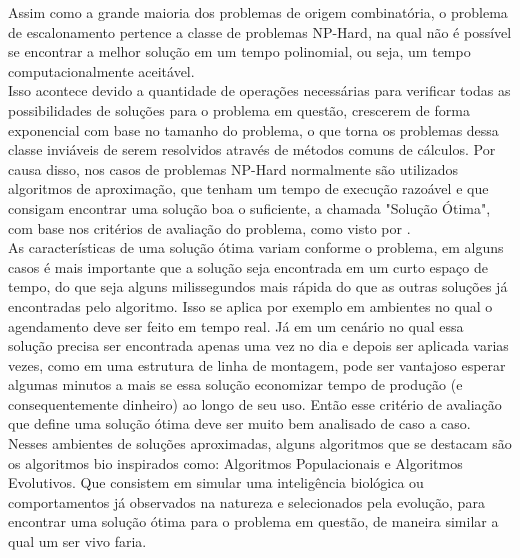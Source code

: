 Assim como a grande maioria dos problemas de origem combinatória, o problema de escalonamento pertence a classe de problemas NP-Hard, na qual não é possível se encontrar a melhor solução em um tempo polinomial, ou seja, um tempo computacionalmente aceitável.\\
\indent Isso acontece devido a quantidade de operações necessárias para verificar todas as possibilidades de soluções para o problema em questão, crescerem de forma exponencial com base no tamanho do problema,
o que torna os problemas dessa classe inviáveis de serem resolvidos através de métodos comuns de cálculos.
%
%
\indent Por causa disso, nos casos de problemas NP-Hard normalmente são utilizados algoritmos de aproximação, que tenham um tempo de execução razoável e que consigam encontrar uma solução boa o suficiente, a chamada "Solução Ótima",  com base nos critérios de avaliação do problema, como visto por \cite{lawler1993}.\\
\indent As características de uma solução ótima variam conforme o problema, em alguns casos é mais importante que a solução seja encontrada em um curto espaço de tempo, do que seja alguns milissegundos mais rápida do que as outras soluções já encontradas pelo algoritmo.
%
Isso se aplica por exemplo em ambientes no qual o agendamento deve ser feito em tempo real.
%
Já em um cenário no qual essa solução precisa ser encontrada apenas uma vez no dia e depois ser aplicada varias vezes, como em uma estrutura de linha de montagem, pode ser vantajoso esperar algumas minutos a mais se essa solução economizar tempo de produção (e consequentemente dinheiro) ao longo de seu uso. Então esse critério de avaliação que define uma solução ótima deve ser muito bem analisado de caso a caso.\\
\indent Nesses ambientes de soluções aproximadas, alguns algoritmos que se destacam são os algoritmos bio inspirados como: Algoritmos Populacionais e Algoritmos Evolutivos. 
Que consistem em simular uma inteligência biológica ou comportamentos já observados na natureza e selecionados pela evolução, para encontrar uma solução ótima para o problema em questão, de maneira similar a qual um ser vivo faria.\\


